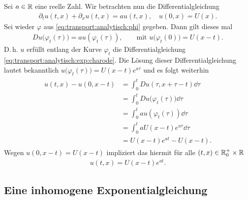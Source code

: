 Sei $a \in \mathbb R$ eine reelle Zahl. Wir betrachten nun die Differentialgleichung
\begin{align}\label{eq:transport:analytisch:exp:homogen}
\partial_t u(t,x) + \partial_x u(t,x) = a u(t,x), \quad u(0, x) = U(x).
\end{align}
Sei wieder $\varphi$ aus \eqref{eq:transport:analytisch:phi} gegeben. Dann gilt dieses mal
\begin{align}\label{eq:transport:analytisch:exp:charode}
D u\bigl(\varphi_t(\tau)\bigr) = a u(\varphi_t(\tau)), \qquad \text{mit $u\bigl(\varphi_t(0) \bigr) = U(x-t)$.}
\end{align}
D.\,h. $u$ erfüllt entlang der Kurve $\varphi_t$ die Differentialgleichung \eqref{eq:transport:analytisch:exp:charode}.
Die Lösung dieser Differentialgleichung lautet bekanntlich $u\bigl(\varphi_t(\tau) \bigr) = U(x-t) e^{a \tau}$ und es folgt weiterhin
\begin{align}
\begin{split}
u(t,x) - u(0,x-t) &= \int_0^t D u(\tau, x + \tau - t) \dd \tau\\
&= \int_0^t D u\bigl(\varphi_t(\tau) \bigr) \dd \tau\\
&= \int_0^t a u(\varphi_t(\tau)) \dd \tau\\
&= \int_0^t a U(x-t) e^{a \tau} \dd \tau\\
&= U(x-t) e^{a t} - U(x-t).
\end{split}
\end{align}
Wegen $u(0,x-t) = U(x-t)$ impliziert das hiermit für alle $(t, x) \in \mathbb R^+_0 \times \mathbb R$
\begin{align}\label{eq:transport:analytisch:exp:loesung}u(t,x) = U(x-t) e^{at}.\end{align}

\subsection*{Eine inhomogene Exponentialgleichung}

